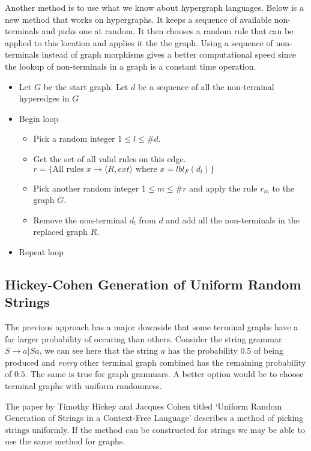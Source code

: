     Another method is to use what we know about hypergraph languages. Below is a new method that works on hypergraphs. It keeps a sequence of available non-terminals and picks one at random. It then chooses a random rule that can be applied to this location and applies it the the graph. Using a sequence of non-terminals instead of graph morphisms gives a better computational speed since the lookup of non-terminals in a graph is a constant time operation.

    \begin{itemize}
    \item Let $G$ be the start graph. Let $d$ be a sequence of all the non-terminal hyperedges in $G$
    \item Begin loop
    \begin{itemize}
    \item Pick a random integer $1 \leq l \leq \#d$.
    \item Get the set of all valid rules on this edge. $r = \{\textrm{All rules $x \to \langle R, ext \rangle$ where $x = lbl_F(d_l)$\}}$
    \item Pick another random integer $1 \leq m \leq \#r$ and apply the rule $r_m$ to the graph $G$.
    \item Remove the non-terminal $d_l$ from $d$ and add all the non-terminals in the replaced graph $R$.
    \end{itemize}
    \item Repeat loop
    \end{itemize}

  \subsection{Hickey-Cohen Generation of Uniform Random Strings}

  The previous approach has a major downside that some terminal graphs have a far larger probability of occuring than others. Consider the string grammar $S \to a | Sa$, we can see here that the string $a$ has the probability $0.5$ of being produced and \emph{every} other terminal graph combined has the remaining probability of $0.5$. The same is true for graph grammars. A better option would be to choose terminal graphs with uniform randomness.

  The paper by Timothy Hickey and Jacques Cohen titled `Uniform Random Generation of Strings in a Context-Free Language' describes a method of picking strings uniformly. If the method can be constructed for strings we may be able to use the same method for graphs.

